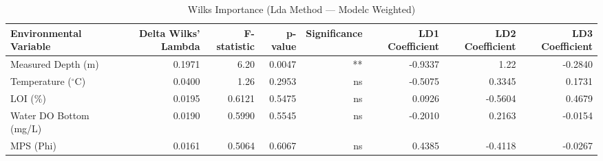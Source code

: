 \begin{table}[htbp]
  \centering
  \caption{Wilks Importance (Lda Method — Modelc Weighted)}
  \label{tab:LDA_Method_ModelC_Weighted_tables_wilks_importance}
  \small
  \begin{tabular}{lrrrrrrr}
    \toprule
    Environmental Variable & Delta Wilks' Lambda & F-statistic & p-value & Significance & LD1 Coefficient & LD2 Coefficient & LD3 Coefficient \\
    \midrule
    Measured Depth (m) & 0.1971 & 6.20 & 0.0047 & ** & -0.9337 & 1.22 & -0.2840 \\
    Temperature ($^{\circ}$C) & 0.0400 & 1.26 & 0.2953 & ns & -0.5075 & 0.3345 & 0.1731 \\
    LOI (\%) & 0.0195 & 0.6121 & 0.5475 & ns & 0.0926 & -0.5604 & 0.4679 \\
    Water DO Bottom (mg/L) & 0.0190 & 0.5990 & 0.5545 & ns & -0.2010 & 0.2163 & -0.0154 \\
    MPS (Phi) & 0.0161 & 0.5064 & 0.6067 & ns & 0.4385 & -0.4118 & -0.0267 \\
    \bottomrule
  \end{tabular}
\end{table}
